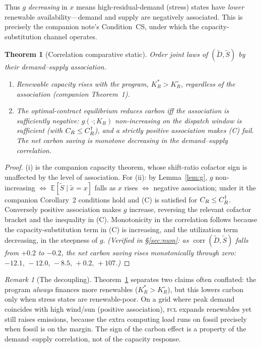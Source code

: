 \documentclass[11pt,reqno]{amsart}
\theoremstyle{plain}
\newtheorem{theorem}{Theorem}
\theoremstyle{definition}
\theoremstyle{remark}
\newtheorem{remark}{Remark}
\newcommand{\KR}{K_R}\newcommand{\KF}{K_F}\newcommand{\KM}{K_M}
\newcommand{\KRs}{K_R^{*}}\newcommand{\KFs}{K_F^{*}}\newcommand{\KMs}{K_M^{*}}
\newcommand{\KRo}{K_R^{\circ}}\newcommand{\KFo}{K_F^{\circ}}
\newcommand{\E}{\mathbb{E}}\newcommand{\PP}{\mathbb{P}}
\begin{document}
Thus $g$ \emph{decreasing} in $x$ means high-residual-demand (stress) states have
\emph{lower} renewable availability---demand and supply are negatively
associated. This is precisely the companion note's Condition~CS, under which the
capacity-substitution channel operates.

\begin{theorem}[Correlation comparative static]\label{thm:corr}
Order joint laws of $(\tilde D,\tilde S)$ by their demand--supply association.
\begin{enumerate}[label=(\roman*),leftmargin=2.2em]
  \item Renewable capacity rises with the program, $\KRs>\KRo$, \emph{regardless}
        of the association (companion Theorem~1).
  \item The optimal-contract equilibrium reduces carbon iff the association is
        sufficiently negative: $g(\cdot;\KR)$ non-increasing on the dispatch
        window is sufficient (with $C_R\le C_R^{\dagger}$), and a strictly positive
        association makes (C) fail. The net carbon saving is monotone decreasing
        in the demand--supply correlation.
\end{enumerate}
\end{theorem}

\begin{proof}
(i) is the companion capacity theorem, whose shift-ratio cofactor sign is
unaffected by the level of association. For (ii): by Lemma~\ref{lem:g},
$g$ non-increasing $\iff$ $\E[\tilde S\mid\tilde x=x]$ falls as $x$ rises $\iff$
negative association; under it the companion Corollary~2 conditions hold and (C)
is satisfied for $C_R\le C_R^{\dagger}$. Conversely positive association makes
$g$ increase, reversing the relevant cofactor bracket and the inequality in (C).
Monotonicity in the correlation follows because the capacity-substitution term in
(C) is increasing, and the utilization term decreasing, in the steepness of $g$.
\emph{(Verified in \S\ref{sec:num}: as $\operatorname{corr}(\tilde D,\tilde S)$
falls from $+0.2$ to $-0.2$, the net carbon saving rises monotonically through
zero: $-12.1,\,-12.0,\,-8.5,\,+0.2,\,+107$.)}
\end{proof}

\begin{remark}[The decoupling]
Theorem~\ref{thm:corr} separates two claims often conflated: the program
\emph{always} finances more renewables ($\KRs>\KRo$), but this lowers carbon only
when stress states are renewable-poor. On a grid where peak demand coincides with
high wind/sun (positive association), \textsc{fcl} expands renewables yet still
raises emissions, because the extra computing load runs on fossil precisely when
fossil is on the margin. The sign of the carbon effect is a property of the
demand--supply correlation, not of the capacity response.
\end{remark}
\end{document}
